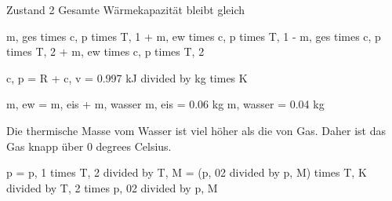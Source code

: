 Zustand 2
Gesamte Wärmekapazität bleibt gleich

m, ges times c, p times T, 1 + m, ew times c, p times T, 1 - m, ges times c, p times T, 2 + m, ew times c, p times T, 2

c, p = R + c, v
= 0.997 kJ divided by kg times K

m, ew = m, eis + m, wasser
m, eis = 0.06 kg
m, wasser = 0.04 kg

Die thermische Masse vom Wasser ist viel höher als die von Gas. Daher ist das Gas knapp über 0 degrees Celsius.

p = p, 1 times T, 2 divided by T, M = (p, 02 divided by p, M) times T, K divided by T, 2 times p, 02 divided by p, M